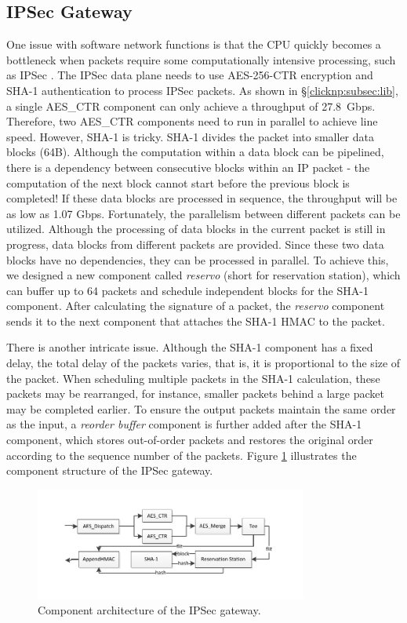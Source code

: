 \subsection{IPSec Gateway}
\label{clicknp:subsec:ipsec}

One issue with software network functions is that the CPU quickly becomes a bottleneck when packets require some computationally intensive processing, such as IPSec \cite {packetshader}. The IPSec data plane needs to use AES-256-CTR encryption and SHA-1 authentication to process IPSec packets. As shown in \S \ref {clicknp:subsec:lib}, a single AES\_CTR component can only achieve a throughput of 27.8~Gbps. Therefore, two AES\_CTR components need to run in parallel to achieve line speed. However, SHA-1 is tricky. SHA-1 divides the packet into smaller data blocks (64B). Although the computation within a data block can be pipelined, there is a dependency between consecutive blocks within an IP packet - the computation of the next block cannot start before the previous block is completed! If these data blocks are processed in sequence, the throughput will be as low as 1.07 Gbps. Fortunately, the parallelism between different packets can be utilized. Although the processing of data blocks in the current packet is still in progress, data blocks from different packets are provided. Since these two data blocks have no dependencies, they can be processed in parallel. To achieve this, we designed a new component called \textit {reservo} (short for reservation station), which can buffer up to 64 packets and schedule independent blocks for the SHA-1 component. After calculating the signature of a packet, the \textit {reservo} component sends it to the next component that attaches the SHA-1 HMAC to the packet.

There is another intricate issue. Although the SHA-1 component has a fixed delay, the total delay of the packets varies, that is, it is proportional to the size of the packet. When scheduling multiple packets in the SHA-1 calculation, these packets may be rearranged, for instance, smaller packets behind a large packet may be completed earlier. To ensure the output packets maintain the same order as the input, a \textit{reorder buffer} component is further added after the SHA-1 component, which stores out-of-order packets and restores the original order according to the sequence number of the packets. Figure \ref{clicknp:fig:IPSec-arch} illustrates the component structure of the IPSec gateway.

\begin{figure}[htbp]
	\centering
	\includegraphics[width=0.8\textwidth]{image/IPSec}
	\caption{Component architecture of the IPSec gateway.}
	\label{clicknp:fig:IPSec-arch}
\end{figure}

